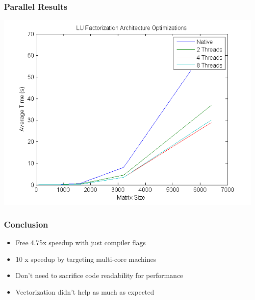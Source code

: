 \documentclass{beamer}
\begin{document}
\begin{frame}
\frametitle{Parallel Results}

\begin{center}
\includegraphics[scale=0.5]{figures/fig5}
\end{center}

\end{frame}

\begin{frame}
\frametitle{Conclusion}
\begin{itemize}
\item Free 4.75x speedup with just compiler flags
\item 10 x speedup by targeting multi-core machines
\item Don't need to sacrifice code readability for performance
\item Vectorization didn't help as much as expected
\end{itemize}
\end{frame}
\end{document}
